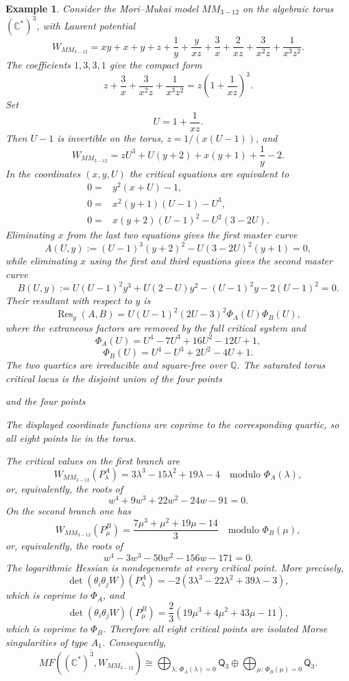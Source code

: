 \documentclass[11pt]{amsart}
\newtheorem{example}{Example}[section]
\newcommand{\MorseCat}[1]{\mathsf{Q}_{#1}}
\newcommand{\fitdisplay}[1]{%
  \begin{center}%
  \resizebox{\textwidth}{!}{$\displaystyle #1$}%
  \end{center}%
}
\begin{document}
\begin{example}
Consider the Mori--Mukai model $MM_{3-12}$ on the algebraic torus
$(\mathbb{C}^*)^3$, with Laurent potential
\[
W_{MM_{3-12}}=xy+x+y+z+\frac{1}{y}+\frac{y}{xz}
+\frac{3}{x}+\frac{2}{xz}+\frac{3}{x^2z}+\frac{1}{x^3z^2}.
\]
The coefficients $1,3,3,1$ give the compact form
\[
z+\frac{3}{x}+\frac{3}{x^2z}+\frac{1}{x^3z^2}
=z\left(1+\frac{1}{xz}\right)^3.
\]
Set
\[
U=1+\frac{1}{xz}.
\]
Then $U-1$ is invertible on the torus, $z=1/(x(U-1))$, and
\[
W_{MM_{3-12}}=zU^3+U(y+2)+x(y+1)+\frac{1}{y}-2.
\]
In the coordinates $(x,y,U)$ the critical equations are equivalent to
\begin{align*}
0={}&y^2(x+U)-1, \\
0={}&x^2(y+1)(U-1)-U^3, \\
0={}&x(y+2)(U-1)^2-U^2(3-2U).
\end{align*}
Eliminating $x$ from the last two equations gives the first master curve
\[
A(U,y):=(U-1)^3(y+2)^2-U(3-2U)^2(y+1)=0,
\]
while eliminating $x$ using the first and third equations gives the second
master curve
\[
B(U,y):=U(U-1)^2y^3+U(2-U)y^2-(U-1)^2y-2(U-1)^2=0.
\]
Their resultant with respect to $y$ is
\[
\operatorname{Res}_y(A,B)
=U(U-1)^2(2U-3)^2\Phi_A(U)\Phi_B(U),
\]
where the extraneous factors are removed by the full critical system and
\[
\Phi_A(U)=U^4-7U^3+16U^2-12U+1,
\]
\[
\Phi_B(U)=U^4-U^3+2U^2-4U+1.
\]
The two quartics are irreducible and square-free over $\mathbb{Q}$. The
saturated torus critical locus is the disjoint union of the four points
\fitdisplay{P^A_\lambda=\left(
\lambda^3-7\lambda^2+11\lambda-1,
-\lambda^2+4\lambda-4,
-6\lambda^3+42\lambda^2-95\lambda+67
\right),
\qquad
\Phi_A(\lambda)=0}
and the four points
\fitdisplay{P^B_\mu=\left(
\frac{\mu^3+\mu^2+\mu+1}{3},
\frac{2\mu^3-\mu^2+2\mu-4}{3},
\frac{4\mu^3-2\mu^2+7\mu-11}{3}
\right),
\qquad
\Phi_B(\mu)=0}
The displayed coordinate functions are coprime to the corresponding quartic,
so all eight points lie in the torus.

The critical values on the first branch are
\[
W_{MM_{3-12}}(P^A_\lambda)=3\lambda^3-15\lambda^2+19\lambda-4
\quad\text{modulo }\Phi_A(\lambda),
\]
or, equivalently, the roots of
\[
w^4+9w^3+22w^2-24w-91=0.
\]
On the second branch one has
\[
W_{MM_{3-12}}(P^B_\mu)=\frac{7\mu^3+\mu^2+19\mu-14}{3}
\quad\text{modulo }\Phi_B(\mu),
\]
or, equivalently, the roots of
\[
w^4-3w^3-50w^2-156w-171=0.
\]
The logarithmic Hessian is nondegenerate at every critical point. More
precisely,
\[
\det(\theta_i\theta_jW)(P^A_\lambda)
=-2(3\lambda^3-22\lambda^2+39\lambda-3),
\]
which is coprime to $\Phi_A$, and
\[
\det(\theta_i\theta_jW)(P^B_\mu)
=\frac{2}{3}(19\mu^3+4\mu^2+43\mu-11),
\]
which is coprime to $\Phi_B$. Therefore all eight critical points are isolated
Morse singularities of type $A_1$. Consequently,
\[
\overline{MF((\mathbb{C}^*)^3,W_{MM_{3-12}})}
\cong \bigoplus_{\lambda:\,\Phi_A(\lambda)=0}\MorseCat{3} \oplus \bigoplus_{\mu:\,\Phi_B(\mu)=0}\MorseCat{3}.
\]
\end{example}
\end{document}
